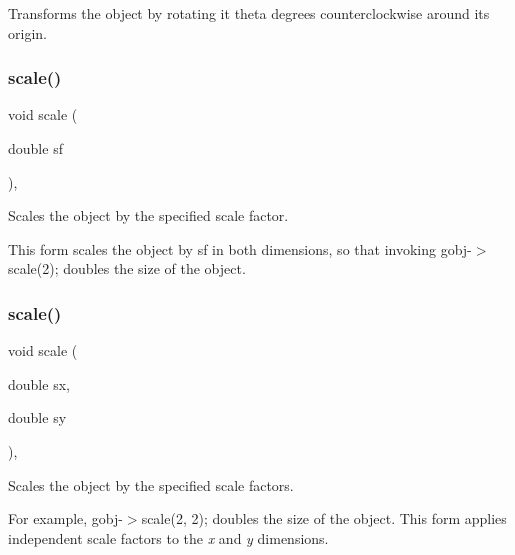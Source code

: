 Transforms the object by rotating it {\ttfamily theta} degrees counterclockwise around its origin. 

\mbox{\label{classGObject_ad2e1900f730475c2d044817db03b38d6}} 
\subsubsection{\texorpdfstring{scale()}{scale()}\hspace{0.1cm}{\footnotesize\ttfamily [1/2]}}
{\footnotesize\ttfamily void scale (\begin{DoxyParamCaption}\item[{double}]{sf }\end{DoxyParamCaption})\hspace{0.3cm}{\ttfamily [virtual]}, {\ttfamily [inherited]}}



Scales the object by the specified scale factor. 

This form scales the object by {\ttfamily sf} in both dimensions, so that invoking {\ttfamily gobj-\/$>$scale(2);} doubles the size of the object. \mbox{\label{classGObject_a63641f69d610d0b951357d35a0c3b1e3}} 
\subsubsection{\texorpdfstring{scale()}{scale()}\hspace{0.1cm}{\footnotesize\ttfamily [2/2]}}
{\footnotesize\ttfamily void scale (\begin{DoxyParamCaption}\item[{double}]{sx,  }\item[{double}]{sy }\end{DoxyParamCaption})\hspace{0.3cm}{\ttfamily [virtual]}, {\ttfamily [inherited]}}



Scales the object by the specified scale factors. 

For example, {\ttfamily gobj-\/$>$scale(2, 2);} doubles the size of the object. This form applies independent scale factors to the {\itshape x} and {\itshape y} dimensions. \mbox{\label{classGObject_ab6747f40313c531c2db32edb5b63b9b7}} 
